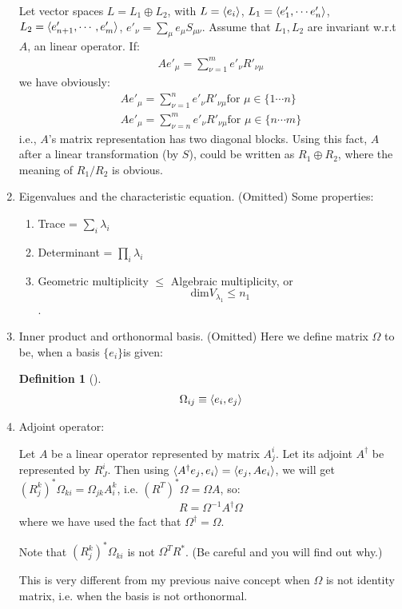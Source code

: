 \documentclass{article}
\numberwithin{equation}{subsection} %
\theoremstyle{definition}
\newtheorem{defi}{Definition}[section]
\begin{document}
\begin{enumerate}
        Let vector spaces $L=L_1\oplus L_2$, with $L=\braket{e_i}$,
        $L_1=\braket{e'_1,\cdots e'_n}$,$L_2=\braket{e'_{n+1},\cdots,e'_m}$,
        $e'_\nu=\sum_\mu e_\mu  S_{\mu\nu}$. 
        Assume that $L_1,L_2$ are invariant w.r.t $A$, an linear operator. If:
        \begin{align}
            A e'_\mu = \sum_{\nu=1}^{m} e'_\nu R'_{\nu\mu}
        \end{align}
        we have obviously:
        \begin{align}
            A e'_\mu = \sum_{\nu=1}^{n} e'_\nu R'_{\nu\mu} \text{for }
                \mu\in \{1\cdots n\}
                \\
            A e'_\mu = \sum_{\nu=n}^{m} e'_\nu R'_{\nu\mu} \text{for }
                \mu\in \{n\cdots m\}
        \end{align}
        i.e., $A$'s matrix representation has two diagonal blocks.
        Using this fact, $A$ after a linear transformation (by $S$),
        could be written as $R_1\oplus R_2$, where the meaning of $R_1/R_2$
        is obvious.
    \item Eigenvalues and the characteristic equation. (Omitted)
        Some properties:
        \begin{enumerate}
            \item Trace = $\sum_i \lambda_i$
            \item Determinant = $\prod_i \lambda_i$
            \item Geometric multiplicity $\leq$ Algebraic multiplicity, or
                $$\mathrm{dim}V_{\lambda_1} \leq n_1$$.
        \end{enumerate}
    \item Inner product and orthonormal basis. (Omitted) Here we define
        matrix $\Omega$ to be, when a basis $\{e_i\}$is given:
        \begin{defi}[]
            \begin{align}
                \Omega_{ij} \equiv \braket{e_i,e_j}
            \end{align}
        \end{defi}
    \item Adjoint operator:

        Let $A$ be a linear operator represented by matrix $A^i_j$. Let
        its adjoint $A^\dagger$ be represented by $R^i_J$. Then using
        $\braket{A^\dagger e_j, e_i} = \braket{e_j,A e_i}$, we will
        get $(R^{k}_j)^* \Omega_{ki}= \Omega_{jk}A^k_i$, i.e.
        $(R^T)^* \Omega = \Omega A$, so:
        \begin{align}
            R = \Omega^{-1} A^\dagger \Omega
        \end{align}
        where we have used the fact that $\Omega^\dagger=\Omega$.

        Note that $(R^{k}_j)^* \Omega_{ki}$ is not $\Omega^T R^*$.
        (Be careful and you will find out why.)

        This is very different from my previous naive concept
        when $\Omega$ is not identity matrix, i.e. when the basis
        is not orthonormal.
\end{enumerate}
\end{document}
